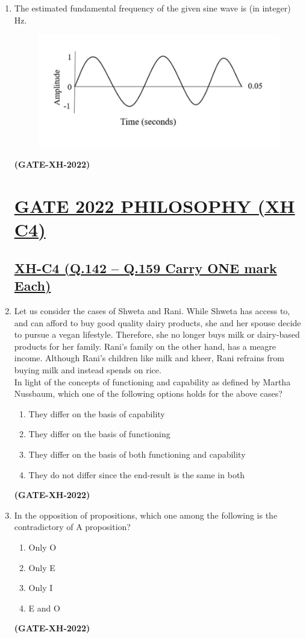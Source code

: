 \documentclass[journal]{IEEEtran}
\begin{document}
\begin{enumerate}
\item The estimated fundamental frequency of the given sine wave is (in integer) \underline{\hspace{2cm}} Hz.  

\begin{figure}[h!]
\centering
\includegraphics[width=0.5\columnwidth]{figs/Q.141.jpeg}
\label{Q.141}
\end{figure}
\hfill\textbf{(GATE-XH-2022)}
\newpage
\section*{\large \underline{\textbf {GATE 2022 PHILOSOPHY (XH C4)}}}
\subsection*{\underline{\textbf {XH-C4 (Q.142 – Q.159 Carry ONE mark Each)}}}

\item Let us consider the cases of Shweta and Rani. While Shweta has access to, and can afford to buy good quality dairy products, she and her spouse decide to pursue a vegan lifestyle. Therefore, she no longer buys milk or dairy-based products for her family. Rani’s family on the other hand, has a meagre income. Although Rani’s children like milk and kheer, Rani refrains from buying milk and instead spends on rice.\\  
In light of the concepts of functioning and capability as defined by Martha Nussbaum, which one of the following options holds for the above cases?  
\begin{enumerate}
\item They differ on the basis of capability  
\item They differ on the basis of functioning  
\item They differ on the basis of both functioning and capability  
\item They do not differ since the end-result is the same in both  
\end{enumerate}
\hfill\textbf{(GATE-XH-2022)}

\item In the opposition of propositions, which one among the following is the contradictory of A proposition?  
\begin{multicols}{4}
\begin{enumerate}
\item Only O  
\item Only E  
\item Only I  
\item E and O  
\end{enumerate}
\end{multicols}
\hfill\textbf{(GATE-XH-2022)}


\end{enumerate}
\end{document}
